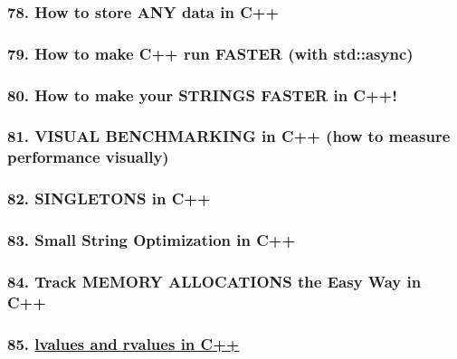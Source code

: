 \documentclass[11pt]{article}
\begin{document}
\hypertarget{how-to-store-any-data-in-c}{%
\subsubsection{78. How to store ANY data in
C++}\label{how-to-store-any-data-in-c}}

\hypertarget{how-to-make-c-run-faster-with-stdasync}{%
\subsubsection{79. How to make C++ run FASTER (with
std::async)}\label{how-to-make-c-run-faster-with-stdasync}}

\hypertarget{how-to-make-your-strings-faster-in-c}{%
\subsubsection{80. How to make your STRINGS FASTER in
C++!}\label{how-to-make-your-strings-faster-in-c}}

\hypertarget{visual-benchmarking-in-c-how-to-measure-performance-visually}{%
\subsubsection{81. VISUAL BENCHMARKING in C++ (how to measure
performance
visually)}\label{visual-benchmarking-in-c-how-to-measure-performance-visually}}

\hypertarget{singletons-in-c}{%
\subsubsection{82. SINGLETONS in C++}\label{singletons-in-c}}

\hypertarget{small-string-optimization-in-c}{%
\subsubsection{83. Small String Optimization in
C++}\label{small-string-optimization-in-c}}

\hypertarget{track-memory-allocations-the-easy-way-in-c}{%
\subsubsection{84. Track MEMORY ALLOCATIONS the Easy Way in
C++}\label{track-memory-allocations-the-easy-way-in-c}}

\hypertarget{lvalues-and-rvalues-in-c}{%
\subsubsection{\texorpdfstring{85.
\href{https://youtu.be/fbYknr-HPYE?list=PLlrATfBNZ98dudnM48yfGUldqGD0S4FFb\&t=179}{lvalues
and rvalues in
C++}}{85. lvalues and rvalues in C++}}\label{lvalues-and-rvalues-in-c}}
\end{document}
